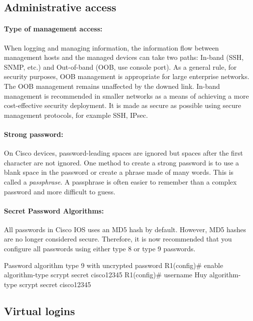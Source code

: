 \subsection{Administrative access}

\paragraph{Type of management access:} 

When logging and managing information, the information flow between management hosts and the managed devices can take two paths: In-band (SSH, SNMP, etc.) and Out-of-band (OOB, use console port). As a general rule, for security purposes, OOB management is appropriate for large enterprise networks. The OOB management remains unaffected by the downed link. In-band management is recommended in smaller networks as a means of achieving a more cost-effective security deployment. It is made as secure as possible using secure management protocols, for example SSH, IPsec.

\paragraph{Strong password:} 

On Cisco devices, password-leading spaces are ignored but spaces after the first character are not ignored. One method to create a strong password is to use a blank space in the password or create a phrase made of many words. This is called a \emph{passphrase}. A passphrase is often easier to remember than a complex password and more difficult to guess.

\paragraph{Secret Password Algorithms:} 

All passwords in Cisco IOS uses an MD5 hash by default. However, MD5 hashes are no longer considered secure. Therefore, it is now recommended that you configure all passwords using either type 8  or type 9  passwords.

\begin{sexylisting}{Password algorithm type 9 with uncrypted password}
R1(config)# enable algorithm-type scrypt secret cisco12345
R1(config)# username Huy algorithm-type scrypt secret cisco12345
\end{sexylisting}


\subsection{Virtual logins}

